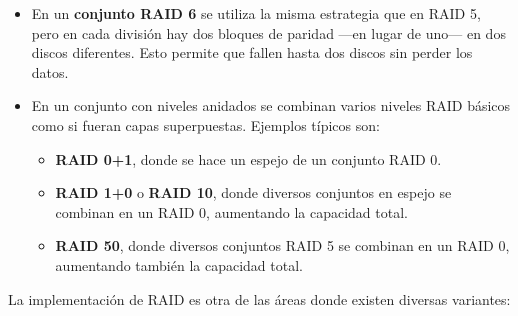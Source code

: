 \begin{itemize}
  \begin{itemize}
  \item
    Cada vez que se escribe un bloque de datos se debe actualizar el
    bloque de paridad. Por lo tanto las escrituras en un conjunto RAID 5
    son costosas en términos de operaciones de disco y tráfico.
  \item
    Los bloques de paridad no se leen durante las lecturas de datos, ya
    que eso reduciría el rendimiento. Solo se hace en caso de que la
    lectura de un sector falle, puesto que el sector en la misma
    posición relativa dentro de cada uno de los otros bloques de datos
    de la división y en el bloque de paridad se pueden utilizar para
    reconstruir el sector erróneo.
  \item
    En un conjunto RAID 5 el fallo de 2 discos provoca la pérdida
    completa de los datos. Esto significa que aunque se pueden añadir
    discos de manera ilimitada, eso no suele ocurrir, puesto que a más
    discos en el conjunto más probabilidad de que fallen dos de ellos.
  \end{itemize}
\item
  En un \textbf{conjunto RAID 6} se utiliza la misma estrategia que en
  RAID 5, pero en cada división hay dos bloques de paridad ---en lugar
  de uno--- en dos discos diferentes. Esto permite que fallen hasta dos
  discos sin perder los datos.
\item
  En un conjunto con niveles anidados se combinan varios niveles RAID
  básicos como si fueran capas superpuestas. Ejemplos típicos son:

  \begin{itemize}
  \item
    \textbf{RAID 0+1}, donde se hace un espejo de un conjunto RAID 0.
  \item
    \textbf{RAID 1+0} o \textbf{RAID 10}, donde diversos conjuntos en
    espejo se combinan en un RAID 0, aumentando la capacidad total.
  \item
    \textbf{RAID 50}, donde diversos conjuntos RAID 5 se combinan en un
    RAID 0, aumentando también la capacidad total.
  \end{itemize}
\end{itemize}

La implementación de RAID es otra de las áreas donde existen diversas
variantes:

